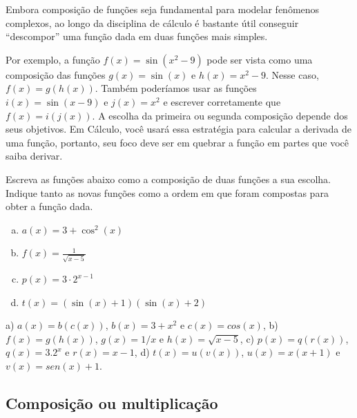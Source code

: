 \documentclass[main.tex]{subfiles}
\begin{document}
Embora composição de funções seja fundamental para modelar fenômenos complexos, ao longo da disciplina de cálculo é bastante útil conseguir ``descompor'' uma função dada em duas funções mais simples.

Por exemplo, a função $f(x)=\sin(x^2-9)$ pode ser vista como uma composição das funções $g(x)=\sin(x)$ e $h(x)=x^2-9$. Nesse caso, $f(x)=g(h(x))$. Também poderíamos usar as funções $i(x)=\sin(x-9)$ e $j(x)=x^2$ e escrever corretamente que $f(x)=i(j(x))$. A escolha da primeira ou segunda composição depende dos seus objetivos. Em Cálculo, você usará essa estratégia para calcular a derivada de uma função, portanto, seu foco deve ser em quebrar a função em partes que você saiba derivar.

\begin{questao}
Escreva as funções abaixo como a composição de duas funções a sua escolha. Indique tanto as novas funções como a ordem em que foram compostas para obter a função dada.
\begin{enumerate}[a)]
\item $a(x)=3+\cos^2(x)$
\item $f(x)=\frac{1}{\sqrt{x-5}}$
\item $p(x)=3 \cdot 2^{x-1}$
\item $t(x)=(\sin(x)+1)(\sin(x)+2)$
\end{enumerate}
\end{questao}


\begin{gabarito}
	\begin{gabaritoQuestao}
		a) $a(x)=b(c(x))$, $b(x)=3+x^2$ e $c(x)=cos(x)$, b) $f(x)=g(h(x))$, $g(x)=1/x$ e $h(x)=\sqrt{x-5}$, c) $p(x)=q(r(x))$, $q(x)=3.2^x$ e $r(x)=x-1$, d) $t(x)=u(v(x))$, $u(x)=x(x+1)$ e $v(x)=sen(x)+1$.
	\end{gabaritoQuestao}
\end{gabarito}

\subsection*{Composição ou multiplicação}
\end{document}
